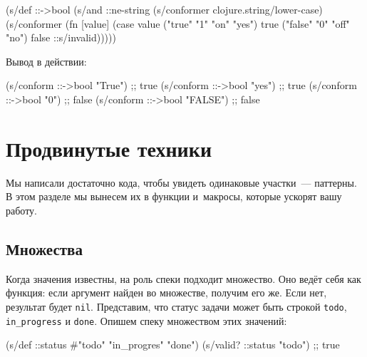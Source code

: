 \else

\begin{english}
  \begin{clojure}
(s/def ::->bool
  (s/and
   ::ne-string
   (s/conformer clojure.string/lower-case)
   (s/conformer
    (fn [value]
      (case value
        ("true" "1" "on" "yes") true
        ("false" "0" "off" "no") false
        ::s/invalid)))))

  \end{clojure}
\end{english}

\fi

\noindent
Вывод в действии:

\begin{english}
  \begin{clojure}
(s/conform ::->bool "True")  ;; true
(s/conform ::->bool "yes")   ;; true
(s/conform ::->bool "0")     ;; false
(s/conform ::->bool "FALSE") ;; false
  \end{clojure}
\end{english}

\section{Продвинутые техники}


Мы написали достаточно кода, чтобы увидеть одинаковые участки~--- паттерны. В
этом разделе мы вынесем их в функции и~макросы, которые ускорят вашу работу.

\subsection{Множества}


Когда значения известны, на роль спеки подходит множество. Оно ведёт себя как
функция: если аргумент найден во множестве, получим его же. Если нет, результат
будет \verb|nil|. Представим, что статус задачи может быть строкой \verb|todo|,
\verb|in_progress| и \verb|done|. Опишем спеку множеством этих значений:

\ifx\DEVICETYPE\MOBILE

\begin{english}
  \begin{clojure}
(s/def ::status
  #{"todo" "in_progres" "done"})
(s/valid? ::status "todo") ;; true
  \end{clojure}
\end{english}

